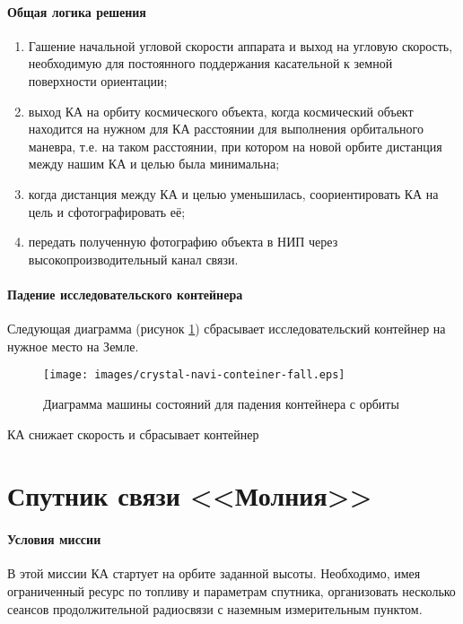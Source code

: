 \documentclass[12pt,a4paper]{article}
\begin{document}
\clearpage
\paragraph{Общая логика решения} 

\begin{enumerate}
\item Гашение начальной угловой скорости аппарата и выход на угловую скорость, необходимую для постоянного поддержания касательной к земной поверхности ориентации;
\item выход КА на орбиту космического объекта, когда космический объект находится на нужном для КА расстоянии для выполнения орбитального маневра, т.е. на таком расстоянии, при котором на новой орбите дистанция между нашим КА и целью была минимальна;
\item когда дистанция между КА и целью уменьшилась, соориентировать КА на цель и сфотографировать её;
\item передать полученную фотографию объекта в НИП через высокопроизводительный канал связи.
\end{enumerate}

\paragraph{Падение исследовательского контейнера} Следующая диаграмма (рисунок \ref{Pic:Сrystal-navi-conteinre-fall}) сбрасывает исследовательский контейнер на нужное место на Земле.

\begin{figure}[tbh]
  \begin{center}
    \texttt{[image: images/crystal-navi-conteiner-fall.eps]}
    \caption{Диаграмма машины состояний для падения контейнера с орбиты}
    \label{Pic:Сrystal-navi-conteinre-fall}
  \end{center}
\end{figure}

КА снижает скорость и сбрасывает контейнер

\section{Спутник связи <<Молния>>}

\paragraph{Условия миссии} В этой миссии КА стартует на орбите
заданной высоты. Необходимо, имея ограниченный ресурс по топливу и параметрам спутника, организовать несколько сеансов продолжительной радиосвязи с наземным измерительным пунктом.
\end{document}

